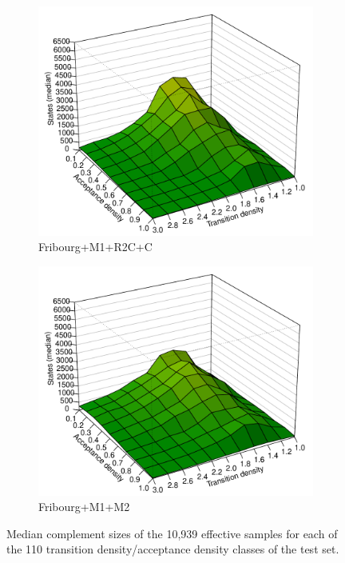 \begin{figure}[ht]
  \hfill
  \begin{subfigure}[t]{\perspwidth\textwidth}
  \centering
  \includegraphics[width=\textwidth]{../results/figures/internal/goal/s.median.Fribourg+M1+R2C+C.pdf}
  \caption{Fribourg+M1+R2C+C}
  \end{subfigure}
  \hfill
  \begin{subfigure}[t]{\perspwidth\textwidth}
  \centering
  \includegraphics[width=\textwidth]{../results/figures/internal/goal/s.median.Fribourg+M1+M2.pdf}
  \caption{Fribourg+M1+M2}
  \end{subfigure}
  \hfill
\caption{Median complement sizes of the 10,939 effective samples for each of the 110 transition density/acceptance density classes of the \goal{} test set.}
\label{i.g.persp_2}
\end{figure}

